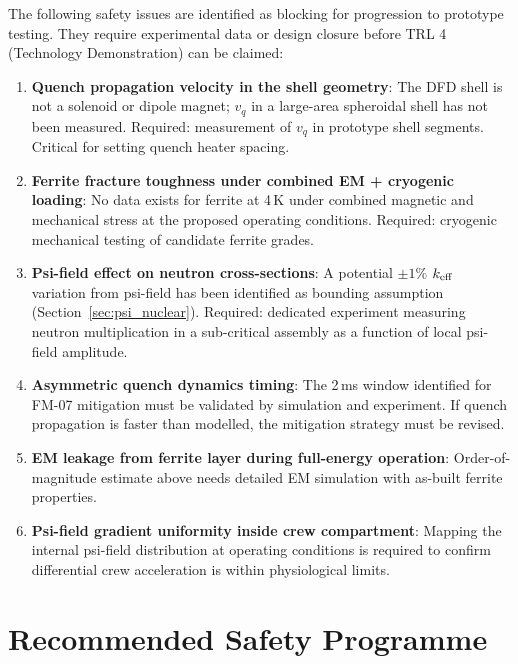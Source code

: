 \documentclass[11pt,a4paper]{article}
\begin{document}
The following safety issues are identified as blocking for progression
to prototype testing. They require experimental data or design closure
before TRL 4 (Technology Demonstration) can be claimed:

\begin{enumerate}
  \item \textbf{Quench propagation velocity in the shell geometry}: The
    DFD shell is not a solenoid or dipole magnet; $v_q$ in a large-area
    spheroidal shell has not been measured. Required: measurement of $v_q$
    in prototype shell segments. Critical for setting quench heater spacing.

  \item \textbf{Ferrite fracture toughness under combined EM + cryogenic
    loading}: No data exists for ferrite at 4\,K under combined magnetic
    and mechanical stress at the proposed operating conditions. Required:
    cryogenic mechanical testing of candidate ferrite grades.

  \item \textbf{Psi-field effect on neutron cross-sections}: A potential
    $\pm 1\%$ $k_{\rm eff}$ variation from psi-field has been identified
    as bounding assumption (Section~\ref{sec:psi_nuclear}). Required:
    dedicated experiment measuring neutron multiplication in a sub-critical
    assembly as a function of local psi-field amplitude.

  \item \textbf{Asymmetric quench dynamics timing}: The 2\,ms window
    identified for FM-07 mitigation must be validated by simulation and
    experiment. If quench propagation is faster than modelled, the
    mitigation strategy must be revised.

  \item \textbf{EM leakage from ferrite layer during full-energy operation}:
    Order-of-magnitude estimate above needs detailed EM simulation with
    as-built ferrite properties.

  \item \textbf{Psi-field gradient uniformity inside crew compartment}:
    Mapping the internal psi-field distribution at operating conditions
    is required to confirm differential crew acceleration is within
    physiological limits.
\end{enumerate}

\section{Recommended Safety Programme}
\label{sec:programme}
\end{document}

